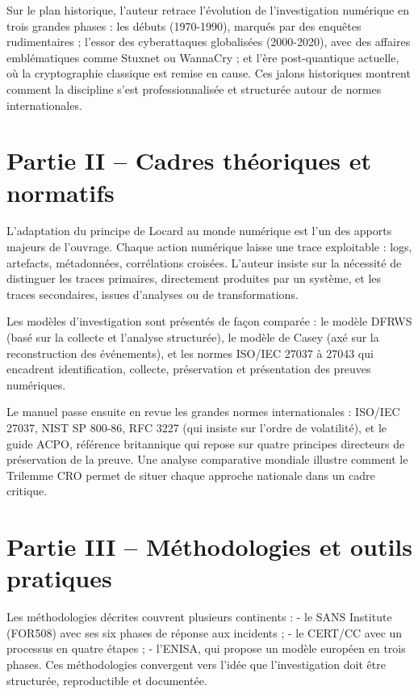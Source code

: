 \documentclass[12pt, a4paper]{article}
\begin{document}
\begin{Large}
\begin{Large}
Sur le plan historique, l'auteur retrace l'évolution de l'investigation numérique en trois grandes phases : les débuts (1970-1990), marqués par des enquêtes rudimentaires ; l'essor des cyberattaques globalisées (2000-2020), avec des affaires emblématiques comme Stuxnet ou WannaCry ; et l'ère post-quantique actuelle, où la cryptographie classique est remise en cause. Ces jalons historiques montrent comment la discipline s'est professionnalisée et structurée autour de normes internationales.

\section*{Partie II -- Cadres théoriques et normatifs}

L'adaptation du principe de Locard au monde numérique est l'un des apports majeurs de l'ouvrage. Chaque action numérique laisse une trace exploitable : logs, artefacts, métadonnées, corrélations croisées. L'auteur insiste sur la nécessité de distinguer les traces primaires, directement produites par un système, et les traces secondaires, issues d'analyses ou de transformations.

Les modèles d'investigation sont présentés de façon comparée : le modèle DFRWS (basé sur la collecte et l'analyse structurée), le modèle de Casey (axé sur la reconstruction des événements), et les normes ISO/IEC 27037 à 27043 qui encadrent identification, collecte, préservation et présentation des preuves numériques.

Le manuel passe ensuite en revue les grandes normes internationales : ISO/IEC 27037, NIST SP 800-86, RFC 3227 (qui insiste sur l'ordre de volatilité), et le guide ACPO, référence britannique qui repose sur quatre principes directeurs de préservation de la preuve. Une analyse comparative mondiale illustre comment le Trilemme CRO permet de situer chaque approche nationale dans un cadre critique.

\section*{Partie III -- Méthodologies et outils pratiques}

Les méthodologies décrites couvrent plusieurs continents : - le SANS Institute (FOR508) avec ses six phases de réponse aux incidents ; - le CERT/CC avec un processus en quatre étapes ; - l'ENISA, qui propose un modèle européen en trois phases. Ces méthodologies convergent vers l'idée que l'investigation doit être structurée, reproductible et documentée.


\end{Large}
\end{Large}
\end{document}
